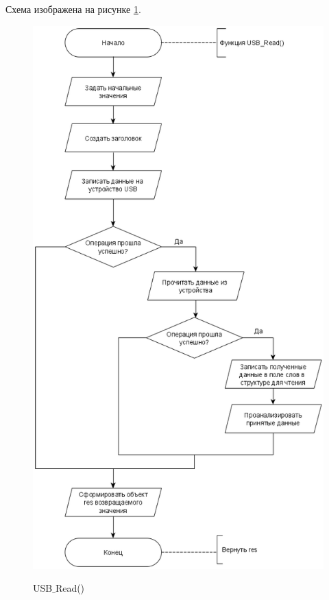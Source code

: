 	Схема изображена на рисунке \ref{fig5:image}.
	
	\begin{figure}[ph!]
		\centering
		\begin{center}
			{\includegraphics[scale=0.5]{schemes/usb_read.png}}
			\caption{USB$\_$Read()}
			\label{fig5:image}
		\end{center}
	\end{figure}

